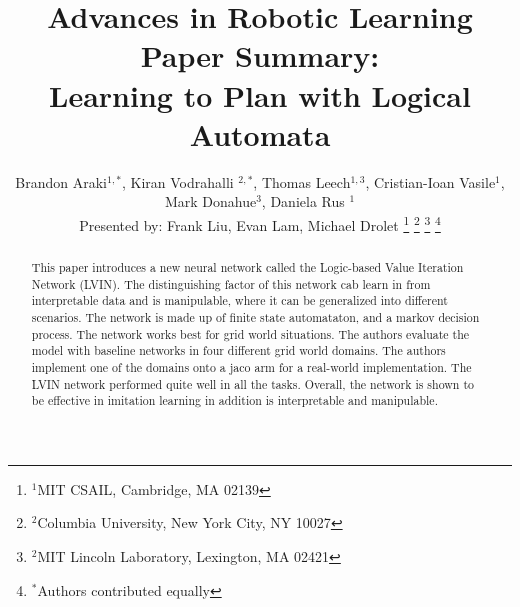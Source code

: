 \documentclass[letterpaper, 10 pt, conference]{ieeeconf}  %
\title{\LARGE \bf
Advances in Robotic Learning Paper Summary: \\
Learning to Plan with Logical Automata
}
\author{Brandon Araki$^{1,*}$, Kiran Vodrahalli $^{2,*}$, Thomas Leech$^{1,3}$, Cristian-Ioan Vasile$^{1}$, Mark Donahue$^{3}$, Daniela Rus $^{1}$ \\
Presented by: Frank Liu, Evan Lam, Michael Drolet
\thanks{$^{1}$MIT CSAIL, Cambridge, MA 02139}%
\thanks{$^{2}$Columbia University, New York City, NY 10027 }%
\thanks{$^{2}$MIT Lincoln Laboratory, Lexington, MA 02421}%
\thanks{$^{*}$Authors contributed equally}%
}
\begin{document}
\maketitle
\thispagestyle{empty}
\pagestyle{empty}


\begin{abstract}

This paper introduces a new neural network called the Logic-based Value Iteration Network (LVIN). The distinguishing factor of this network cab learn in from interpretable data and is manipulable, where it can be generalized into different scenarios. The network is made up of finite state automataton, and a markov decision process. The network works best for grid world situations. The authors evaluate the model with baseline networks in four different grid world domains. The authors implement one of the domains onto a jaco arm for a real-world implementation. The LVIN network performed quite well in all the tasks. Overall, the network is shown to be effective in imitation learning in addition is interpretable and manipulable.

\end{abstract}


\end{document}
